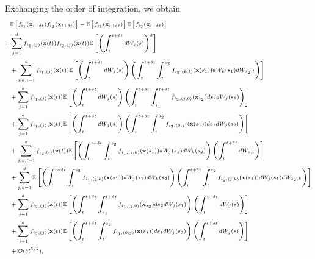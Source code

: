 %
Exchanging the order of integration, we obtain
%
\begin{equation}
\scriptsize
\begin{aligned}
&\mathbb{E} \left[ f_{i_1}(\mathbf{x}_{t + \delta t}) f_{i_2}(\mathbf{x}_{t + \delta t}) \right] 
- \mathbb{E} \left[ f_{i_1}(\mathbf{x}_{t + \delta t}) \right] \mathbb{E} \left[ f_{i_2}(\mathbf{x}_{t + \delta t}) \right] \\
=& 
 \sum_{j=1}^d f_{{i_1},(j)}(\mathbf{x}(t)) f_{{i_2},(j)}(\mathbf{x}(t)) \mathbb{E} \left[ \left( \int_t^{t + \delta t} dW_j(s) \right)^2 \right] \\
&+ \sum_{j,k,l=1}^d f_{{i_1},(j)}(\mathbf{x}(t)) \mathbb{E} \left[ \left( \int_t^{t + \delta t} dW_j(s) \right) \left( \int_t^{t+\delta t} \int_t^{s_2} f_{{i_2},(k,l)}(\mathbf{x}(s_1)) dW_k(s_1) dW_{s_2, l} \right) \right] \\
&+ \sum_{j=1}^d f_{{i_1},(j)}(\mathbf{x}(t)) \mathbb{E} \left[ \left( \int_t^{t + \delta t} dW_j(s) \right)\left( \int_t^{t+\delta t} \int_{s_1}^{t+\delta t} f_{{i_2},(j,0)}(\mathbf{x}_{s_2}) ds_2 dW_j(s_1)  \right) \right]\\
&+ \sum_{j=1}^d f_{{i_1},(j)}(\mathbf{x}(t)) \mathbb{E} \left[ \left( \int_t^{t + \delta t} dW_j(s) \right) \left( \int_t^{t+\delta t} \int_t^{s_2} f_{{i_2},(0,j)}(\mathbf{x}(s_1)) ds_1 dW_j(s_2) \right) \right] \\
&+  \sum_{j, k, l=1}^d  f_{{i_2},(l)}(\mathbf{x}(t))\mathbb{E} \left[ \left( \int_t^{t+\delta t} \int_t^{s_2} f_{{i_1},(j,k)}(\mathbf{x}(s_1)) dW_j(s_1) dW_k(s_2) \right) \left( \int_t^{t + \delta t} dW_{s,l} \right) \right] \\
&+ \sum_{j, k=1}^d \mathbb{E} \left[ \left( \int_t^{t+\delta t} \int_t^{s_2} f_{{i_1},(j,k)}(\mathbf{x}(s_1)) dW_j(s_1) dW_k(s_2) \right) \left( \int_t^{t+\delta t} \int_t^{s_2} f_{{i_2},(j,k)}(\mathbf{x}(s_1)) dW_j(s_1) dW_{s_2,k} \right) \right] \\
&+  \sum_{j=1}^d f_{{i_2},(j)}(\mathbf{x}(t)) \mathbb{E} \left[ \left( \int_t^{t+\delta t} \int_{s_1}^{t + \delta t} f_{{i_1},(j,0)}(\mathbf{x}_{s_2}) ds_2 dW_j(s_1)   \right) \left( \int_t^{t + \delta t} dW_j(s) \right) \right]\\
&+   \sum_{j=1}^d  f_{{i_2},(j)}(\mathbf{x}(t)) \mathbb{E} \left[ \left( \int_t^{t+\delta t} \int_t^{s_2} f_{{i_1},(0,j)}(\mathbf{x}(s_1)) ds_1 dW_j(s_2)  \right) \left(\int_t^{t + \delta t} dW_j(s) \right) \right] \\
&+ \mathcal{O} (\delta t^{5/2}),
\end{aligned}
\end{equation}
